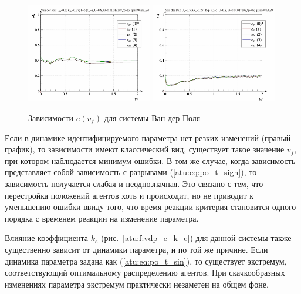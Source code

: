 \begin{figure}[ht!]
\begin{center}
  \includegraphics[width=0.49\textwidth]{p/cha/vdp/vdp_id-p_v_f_sign.png}
  \hfill
  \includegraphics[width=0.49\textwidth]{p/cha/vdp/vdp_id-p_v_f_sin.png}
\end{center}
  \caption{Зависимости $\bar{e}(v_f)$ для системы Ван-дер-Поля}
\label{atu:f:vdp_e_v_f}
\end{figure}

Если в динамике идентифицируемого параметра нет
резких изменений (правый график), то
зависимости имеют классический вид,
существует такое значение $v_f$, при котором наблюдается
минимум ошибки. В том же случае, когда зависимость представляет собой
зависимость с разрывами (\ref{atu:eq:po_t_sign}),
то зависимость получается слабая и неоднозначная.
Это связано с тем, что перестройка положений агентов
хоть и происходит, но не приводит к уменьшению ошибки
ввиду того, что время реакции критерия становится одного порядка
с временем реакции на изменение параметра.


Влияние коэффициента $k_e$ (рис.~\ref{atu:f:vdp_e_k_e})
для данной системы также существенно зависит от динамики
параметра, и по той же причине.
Если динамика параметра задана как (\ref{atu:eq:po_t_sin}),
то существует экстремум, соответствующий оптимальному распределению агентов.
При скачкообразных изменениях параметра экстремум практически незаметен
на общем фоне.

